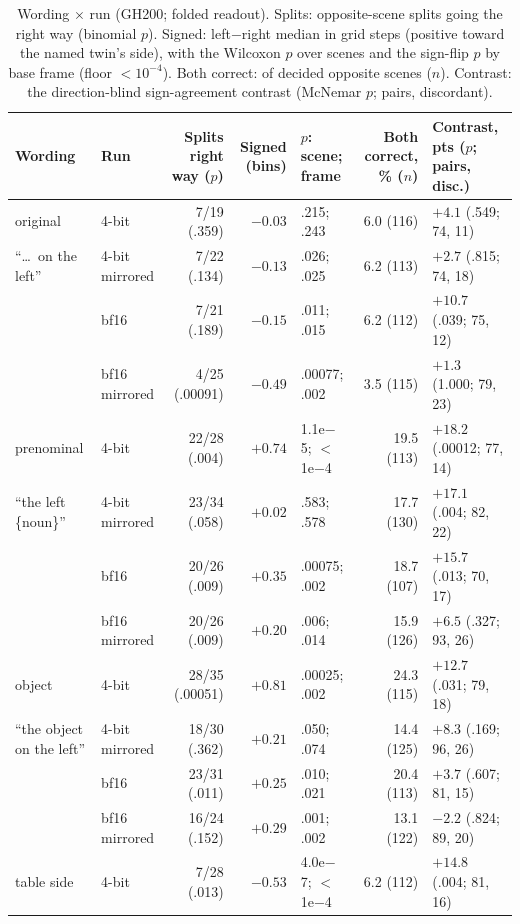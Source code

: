 \documentclass[conference]{IEEEtran}
\begin{document}
\begin{table}[t]
\centering
\scriptsize
\setlength{\tabcolsep}{3.5pt}
\caption{Wording $\times$ run (GH200; folded readout). Splits: opposite-scene splits going the right way (binomial $p$). Signed: left$-$right median in grid steps (positive toward the named twin's side), with the Wilcoxon $p$ over scenes and the sign-flip $p$ by base frame (floor $<10^{-4}$). Both correct: of decided opposite scenes ($n$). Contrast: the direction-blind sign-agreement contrast (McNemar $p$; pairs, discordant).}
\label{tab:wording}
\begin{tabular}{@{}l l r r l r l@{}}
\toprule
Wording & Run & Splits right way ($p$) & Signed (bins) & $p$: scene; frame & Both correct, \% ($n$) & Contrast, pts ($p$; pairs, disc.)\\
\midrule
original & 4-bit & 7/19 (.359) & $-0.03$ & .215; .243 & 6.0 (116) & $+4.1$ (.549; 74, 11)\\
``\dots\ on the left'' & 4-bit mirrored & 7/22 (.134) & $-0.13$ & .026; .025 & 6.2 (113) & $+2.7$ (.815; 74, 18)\\
 & bf16 & 7/21 (.189) & $-0.15$ & .011; .015 & 6.2 (112) & $+10.7$ (.039; 75, 12)\\
 & bf16 mirrored & 4/25 (.00091) & $-0.49$ & .00077; .002 & 3.5 (115) & $+1.3$ (1.000; 79, 23)\\
\midrule
prenominal & 4-bit & 22/28 (.004) & $+0.74$ & 1.1e$-$5; $<$1e$-$4 & 19.5 (113) & $+18.2$ (.00012; 77, 14)\\
``the left \{noun\}'' & 4-bit mirrored & 23/34 (.058) & $+0.02$ & .583; .578 & 17.7 (130) & $+17.1$ (.004; 82, 22)\\
 & bf16 & 20/26 (.009) & $+0.35$ & .00075; .002 & 18.7 (107) & $+15.7$ (.013; 70, 17)\\
 & bf16 mirrored & 20/26 (.009) & $+0.20$ & .006; .014 & 15.9 (126) & $+6.5$ (.327; 93, 26)\\
\midrule
object & 4-bit & 28/35 (.00051) & $+0.81$ & .00025; .002 & 24.3 (115) & $+12.7$ (.031; 79, 18)\\
``the object on the left'' & 4-bit mirrored & 18/30 (.362) & $+0.21$ & .050; .074 & 14.4 (125) & $+8.3$ (.169; 96, 26)\\
 & bf16 & 23/31 (.011) & $+0.25$ & .010; .021 & 20.4 (113) & $+3.7$ (.607; 81, 15)\\
 & bf16 mirrored & 16/24 (.152) & $+0.29$ & .001; .002 & 13.1 (122) & $-2.2$ (.824; 89, 20)\\
\midrule
table side & 4-bit & 7/28 (.013) & $-0.53$ & 4.0e$-$7; $<$1e$-$4 & 6.2 (112) & $+14.8$ (.004; 81, 16)\\

\end{tabular}
\end{table}
\end{document}
